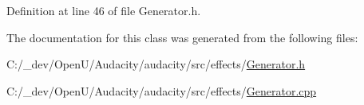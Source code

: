 Definition at line 46 of file Generator.\+h.



The documentation for this class was generated from the following files\+:\begin{DoxyCompactItemize}
\item 
C\+:/\+\_\+dev/\+Open\+U/\+Audacity/audacity/src/effects/\hyperlink{src_2effects_2_generator_8h}{Generator.\+h}\item 
C\+:/\+\_\+dev/\+Open\+U/\+Audacity/audacity/src/effects/\hyperlink{src_2effects_2_generator_8cpp}{Generator.\+cpp}\end{DoxyCompactItemize}
